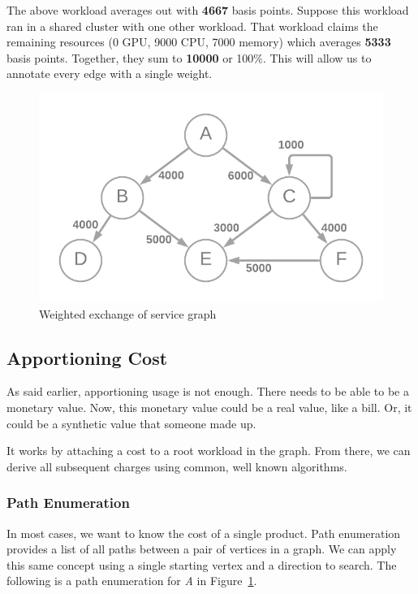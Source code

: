 \documentclass[10pt, a4paper, twocolumn]{article}
\begin{document}
    The above workload averages out with \textbf{4667} basis points.
    Suppose this workload ran in a shared cluster with one other workload.
    That workload claims the remaining resources (0 GPU, 9000 CPU, 7000 memory) which averages \textbf{5333} basis points.
    Together, they sum to \textbf{10000} or 100\%.
    This will allow us to annotate every edge with a single weight.

    \begin{figure}[H]
      \centering
      \includegraphics[width=\linewidth]{./cost-attribution-graph-weighted.png}
      \caption{Weighted exchange of service graph}
      \label{figure:3}
    \end{figure}

  \subsection*{Apportioning Cost}
    As said earlier, apportioning usage is not enough.
    There needs to be able to be a monetary value.
    Now, this monetary value could be a real value, like a bill.
    Or, it could be a synthetic value that someone made up.

    It works by attaching a cost to a root workload in the graph.
    From there, we can derive all subsequent charges using common, well known algorithms.

    \subsubsection*{Path Enumeration}
      In most cases, we want to know the cost of a single product.
      Path enumeration provides a list of all paths between a pair of vertices in a graph.
      We can apply this same concept using a single starting vertex and a direction to search.
      The following is a path enumeration for \textit{A} in Figure~\ref{figure:3}.
\end{document}
